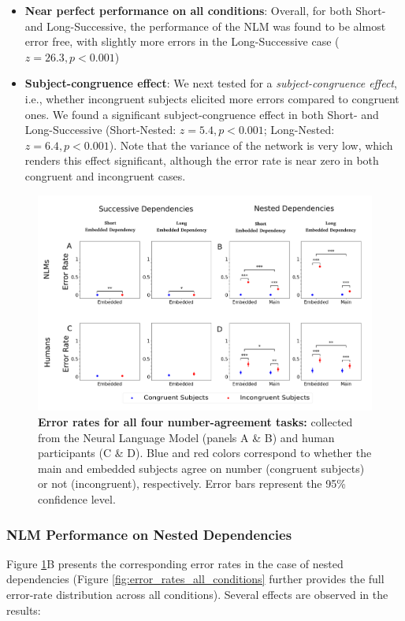 \begin{itemize}
    \item \textbf{Near perfect performance on all conditions}: Overall, for both Short- and Long-Successive, the performance of the NLM was found to be almost error free, with slightly more errors in the Long-Successive case ($z=26.3, p<0.001$)
    \item \textbf{Subject-congruence effect}: We next tested for a \textit{subject-congruence effect}, i.e., whether incongruent subjects elicited more errors compared to congruent ones. We found a significant subject-congruence effect in both Short- and Long-Successive (Short-Nested: $z=5.4, p<0.001$; Long-Nested: $z=6.4, p<0.001$). Note that the variance of the network is very low, which renders this effect significant, although the error rate is near zero in both congruent and incongruent cases.
\end{itemize}
 
 \begin{figure}[ht]
    \centering
    \includegraphics[width=16cm]{figures/error_rates_plural_attractor.png}
    \caption{\textbf{Error rates for all four number-agreement tasks:} collected from the Neural Language Model (panels A \& B) and human participants (C \& D). Blue and red colors correspond to whether the main and embedded subjects agree on number (congruent subjects) or not (incongruent), respectively. Error bars represent the 95\% confidence level.}
    \label{fig:error_rates_plural_subject}
\end{figure}


\subsubsection{NLM Performance on Nested Dependencies}
Figure \ref{fig:error_rates_plural_subject}B presents the corresponding error rates in the case of nested dependencies (Figure \ref{fig:error_rates_all_conditions} further provides the full error-rate distribution across all conditions). Several effects are observed in the results:

